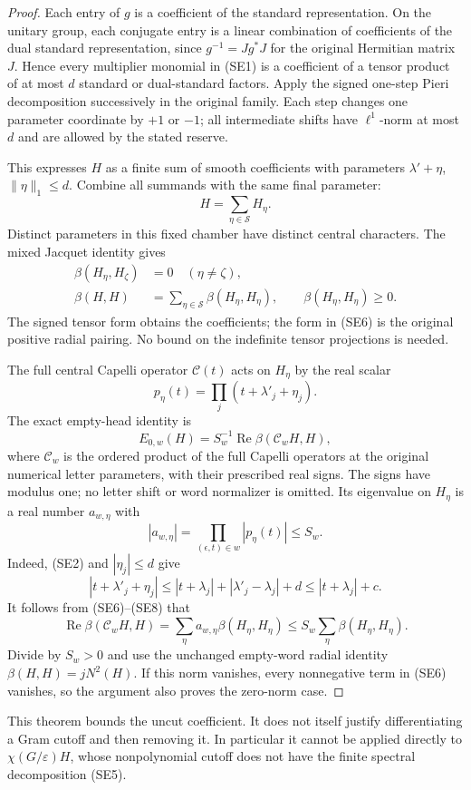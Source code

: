 \begin{proof}
Each entry of \(g\) is a coefficient of the standard
representation. On the unitary group, each conjugate entry is
a linear combination of coefficients of the dual standard
representation, since \(g^{-1}=Jg^*J\) for the original
Hermitian matrix \(J\). Hence every multiplier monomial in
(SE1) is a coefficient of a tensor product of at most \(d\)
standard or dual-standard factors. Apply the signed one-step
Pieri decomposition successively in the original family.
Each step changes one parameter coordinate by \(+1\) or \(-1\);
all intermediate shifts have \(\ell^1\)-norm at most \(d\)
and are allowed by the stated reserve.

This expresses \(H\) as a finite sum of smooth coefficients
with parameters \(\lambda'+\eta\), \(\|\eta\|_1\le d\).
Combine all summands with the same final parameter:
\[
                          H=\sum_{\eta\in\mathcal S}H_\eta.
                                                        \tag{SE5}
\]
Distinct parameters in this fixed chamber have distinct central
characters. The mixed Jacquet identity gives
\[
 \begin{split}
 \beta(H_\eta,H_\zeta)&=0\quad(\eta\ne\zeta),\\
 \beta(H,H)&=\sum_{\eta\in\mathcal S}\beta(H_\eta,H_\eta),
 \qquad \beta(H_\eta,H_\eta)\ge0.
 \end{split}                                           \tag{SE6}
\]
The signed tensor form obtains the coefficients; the form in
(SE6) is the original positive radial pairing. No bound on the
indefinite tensor projections is needed.

The full central Capelli operator \(\mathscr C(t)\) acts on
\(H_\eta\) by the real scalar
\[
                   p_\eta(t)=\prod_j(t+\lambda'_j+\eta_j).
\]
The exact empty-head identity is
\[
 E_{0,w}(H)=S_w^{-1}
      \operatorname{Re}\beta(\mathscr C_w H,H),
                                                        \tag{SE7}
\]
where \(\mathscr C_w\) is the ordered product of the full
Capelli operators at the original numerical letter parameters,
with their prescribed real signs. The signs have modulus one;
no letter shift or word normalizer is omitted. Its eigenvalue
on \(H_\eta\) is a real number \(a_{w,\eta}\) with
\[
 |a_{w,\eta}|=\prod_{(\epsilon,t)\in w}|p_\eta(t)|
                                      \le S_w .         \tag{SE8}
\]
Indeed, (SE2) and \(|\eta_j|\le d\) give
\[
 |t+\lambda'_j+\eta_j|
       \le |t+\lambda_j|+|\lambda'_j-\lambda_j|+d
       \le |t+\lambda_j|+c.
\]
It follows from (SE6)--(SE8) that
\[
 \operatorname{Re}\beta(\mathscr C_wH,H)
      =\sum_\eta a_{w,\eta}\beta(H_\eta,H_\eta)
      \le S_w\sum_\eta\beta(H_\eta,H_\eta).
\]
Divide by \(S_w>0\) and use the unchanged empty-word radial
identity \(\beta(H,H)=jN^2(H)\). If this norm vanishes,
every nonnegative term in (SE6) vanishes, so the argument
also proves the zero-norm case.
\end{proof}

This theorem bounds the uncut coefficient. It does not itself
justify differentiating a Gram cutoff and then removing it.
In particular it cannot be applied directly to
\(\chi(G/\varepsilon)H\), whose nonpolynomial cutoff does
not have the finite spectral decomposition (SE5).
